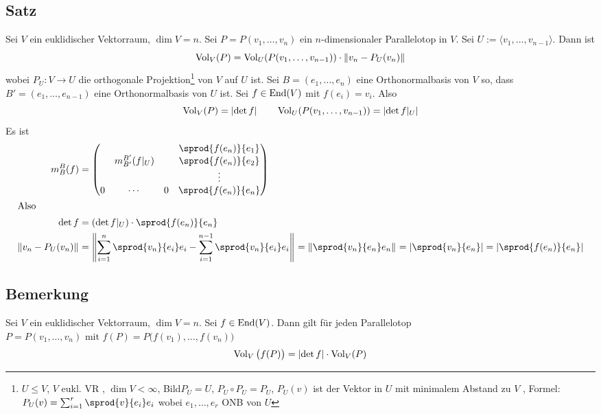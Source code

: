 \subsection[Satz über das Volumen in einem Unterraum]{Satz} %
\label{sub:28}
Sei $V$ ein euklidischer Vektorraum, $\dim V =n$. Sei $P=P(v_1, \ldots , v_n)$ ein $n$-dimensionaler Parallelotop in $V$. Sei $U:= \langle v_1, \ldots , v_{n-1} \rangle$.
Dann ist
\[
	\vol{V} \enbrace*{P} = \Vol_U \enbrace*{P(v_1, \ldots , v_{n-1})} \cdot \norm[]{v_n - P_U(v_n)}   
\]
wobei $P_U : V \to U$ die orthogonale Projektion\footnote{$U \le V$, $V$ eukl. VR , $\dim V < \infty$, Bild$P_U = U$, $P_U \circ P_U = P_U$,  $P_U (v)$ ist der Vektor in $U$ mit minimalem Abstand zu $V$ , Formel: $P_U (v) = \sum_{i=1}^{r} \sprod{v}{e_i} e_i$ wobei $e_1, \ldots , e_r$ ONB von $U$} von $V$ auf $U$ ist. 
Sei $B= (e_1, \ldots , e_n)$ eine Orthonormalbasis von $V$ so, dass $B'=(e_1, \ldots , e_{n-1})$ eine Orthonormalbasis von $U$ ist. Sei $f \in \End(V)$ mit 
$f(e_i)=v_i$. Also
\[
	\vol{V} (P) = \abs*{\det f} \qquad \vol{U} (P(v_1, \ldots , v_{n-1})) = \abs*{\det f|_{U}}   
\]
Es ist
\begin{align*}
	m_B^B (f) &= {\begin{pmatrix}
		& & & \sprod{f(e_n)}{e_1} \\
		& m_{B'}^{B'}(f|_U) & & \sprod{f(e_n)}{e_2} \\
		& & & \vdots  \\
		0 & \cdots & 0 & \sprod{f(e_n)}{e_n}   
	\end{pmatrix}} \\
	\intertext{Also}
	\det f &= (\det f|_U) \cdot  \sprod{f (e_n)}{e_n} \\
	\norm[]{v_n - P_U(v_n)} &= \norm[]{\sum_{i=1}^{n} \sprod{v_n}{e_i} e_i - \sum_{i=1}^{n-1} \sprod{v_n }{e_i} e_i   } 
	= \norm[]{\sprod{v_n}{e_n} e_n} = \abs*{\sprod{v_n}{e_n} } = \abs*{\sprod{f (e_n)}{e_n}}    
\end{align*}


\subsection[Bemerkung über das Volumen eines Parallelotops unter einem Endomorphismus]{Bemerkung} %
\label{sub:29}
Sei $V$ ein euklidischer Vektorraum, $\dim V = n$. Sei $f \in \End(V)$. Dann gilt für jeden Parallelotop 
$P=P(v_1, \ldots , v_n) \text{ mit } f(P) = P\big(f(v_1), \ldots , f(v_n)\big)$
\[
	\vol{V} \big(f(P)\big) = \abs*{\det f} \cdot \vol{V}(P)  
\]
\newpage

